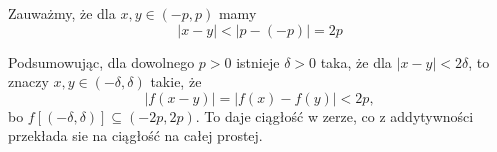 \documentclass{article}
\begin{document}
Zauważmy, że dla $x,y\in(-p,p)$ mamy
$$|x-y|<|p-(-p)|=2p$$

Podsumowując, dla dowolnego $p>0$ istnieje $\delta>0$ taka, że dla $|x-y|<2\delta$, to znaczy $x,y\in(-\delta,\delta)$ takie, że 
$$|f(x-y)|=|f(x)-f(y)|<2p,$$
bo $f[(-\delta,\delta)]\subseteq (-2p,2p)$. To daje ciągłość w zerze, co z addytywności przekłada sie na ciągłość na całej prostej.
\end{document}
